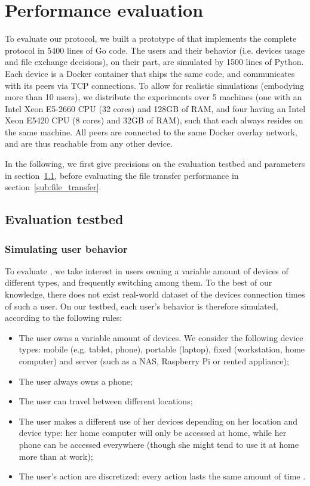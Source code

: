 
\section{Performance evaluation}%
\label{Performance}

To evaluate our protocol, we built a prototype of \name that implements the complete \name protocol in 5400 lines of Go code.
The users and their behavior (i.e. devices usage and file exchange decisions), on their part, are simulated by 1500 lines of Python.
Each device is a Docker container that ships the same \name code, and communicates with its peers via TCP connections.
To allow for realistic simulations (embodying more than 10 users), we distribute the experiments over 5 machines (one with an Intel Xeon E5-2660 CPU (32 cores) and 128GB of RAM, and four having an Intel Xeon E5420 CPU (8 cores) and 32GB of RAM), such that each \squad always resides on the same machine.
All peers are connected to the same Docker overlay network, and are thus reachable from any other device.

In the following, we first give precisions on the evaluation testbed and parameters in section~\ref{sub:evaluation_testbed}, before evaluating the file transfer performance in section~\ref{sub:file_transfer}.

\subsection{Evaluation testbed} %
\label{sub:evaluation_testbed}

\subsubsection{Simulating user behavior} %
\label{ssub:simulating_user_behavior}

To evaluate \name, we take interest in users owning a variable amount of devices of different types, and frequently switching among them.
To the best of our knowledge, there does not exist real-world dataset of the devices connection times of such a user.
On our testbed, each user's behavior is therefore simulated, according to the following rules:
\begin{itemize}
  \item The user owns a variable amount of devices. We consider the following device types: mobile (e.g. tablet, phone), portable (laptop), fixed (workstation, home computer) and server (such as a NAS, Raspberry Pi or rented appliance);
  \item The user always owns a phone;
	\item The user can travel between different locations;
	\item The user makes a different use of her devices depending on her location and device type: 
  her home computer will only be accessed at home, while her phone can be accessed everywhere (though she might tend to use it at home more than at work);
  \item The user's action are discretized: every action lasts the same amount of time \tuser.
\end{itemize}

